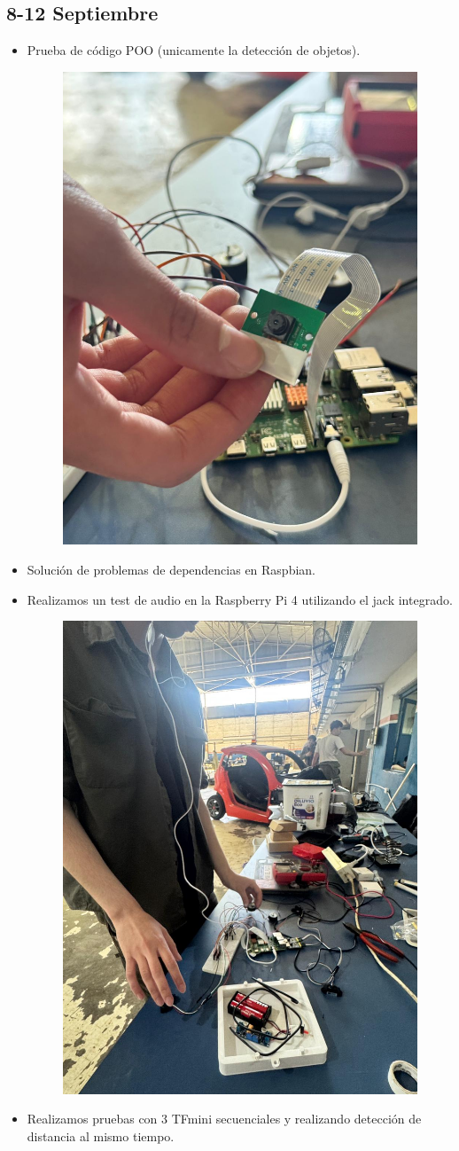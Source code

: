 \documentclass[12pt,a4paper]{article}
\begin{document}
\subsection*{8-12 Septiembre}
\begin{itemize}
\item Prueba de código POO (unicamente la detección de objetos).

\begin{figure}[H]
    \centering
    \includegraphics[width=0.5\linewidth]{Carpeta de campo/Camara.png}
\end{figure}
\item Solución de problemas de dependencias en Raspbian.
\item Realizamos un test de audio en la Raspberry Pi 4 utilizando el jack integrado.

\begin{figure}[H]
    \centering
    \includegraphics[width=0.4\linewidth]{Carpeta de campo/Audio.png}
\end{figure}
\item Realizamos pruebas con 3 TFmini secuenciales y realizando detección de distancia al mismo tiempo.


\end{itemize}
\end{document}
